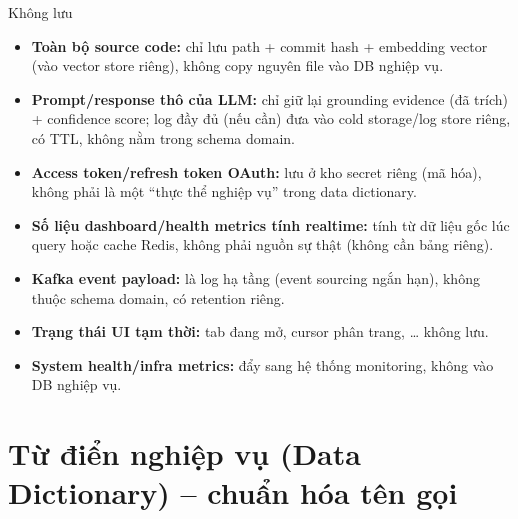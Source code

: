 Không lưu
\begin{itemize}

    \item \textbf{Toàn bộ source code:}
    chỉ lưu path + commit hash + embedding vector
    (vào vector store riêng), không copy nguyên file vào DB nghiệp vụ.

    \item \textbf{Prompt/response thô của LLM:}
    chỉ giữ lại grounding evidence (đã trích) + confidence score;
    log đầy đủ (nếu cần) đưa vào cold storage/log store riêng,
    có TTL, không nằm trong schema domain.

    \item \textbf{Access token/refresh token OAuth:}
    lưu ở kho secret riêng (mã hóa), không phải là một
    ``thực thể nghiệp vụ'' trong data dictionary.

    \item \textbf{Số liệu dashboard/health metrics tính realtime:}
    tính từ dữ liệu gốc lúc query hoặc cache Redis,
    không phải nguồn sự thật (không cần bảng riêng).

    \item \textbf{Kafka event payload:}
    là log hạ tầng (event sourcing ngắn hạn), không thuộc schema domain,
    có retention riêng.

    \item \textbf{Trạng thái UI tạm thời:}
    tab đang mở, cursor phân trang, \ldots{} không lưu.

    \item \textbf{System health/infra metrics:}
    đẩy sang hệ thống monitoring, không vào DB nghiệp vụ.

\end{itemize}



\section{Từ điển nghiệp vụ (Data Dictionary) -- chuẩn hóa tên gọi}
\label{sec:data-dictionary}

